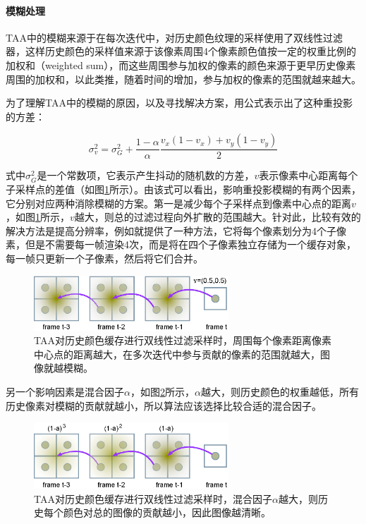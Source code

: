 \paragraph{模糊处理}
TAA中的模糊来源于在每次迭代中，对历史颜色纹理的采样使用了双线性过滤器，这样历史颜色的采样值来源于该像素周围4个像素颜色值按一定的权重比例的加权和（weighted sum），而这些周围参与加权的像素的颜色来源于更早历史像素周围的加权和，以此类推，随着时间的增加，参与加权的像素的范围就越来越大。

为了理解TAA中的模糊的原因，以及寻找解决方案，\cite{a:AmortizedSupersampling}用公式表示出了这种重投影的方差：

\begin{equation}
	\sigma^{2}_v=\sigma^{2}_G+\frac{1-\alpha}{\alpha}\frac{v_x (1-v_x)+v_y(1-v_y)}{2}
\end{equation}

式中$\sigma^{2}_G$是一个常数项，它表示产生抖动的随机数的方差，$v$表示像素中心距离每个子采样点的差值（如图\ref{f:shade-blur-factor-filter}所示）。由该式可以看出，影响重投影模糊的有两个因素，它分别对应两种消除模糊的方案。第一是减少每个子采样点到像素中心点的距离$v$，如图\ref{f:shade-blur-factor-filter}所示，$v$越大，则总的过滤过程向外扩散的范围越大。针对此，比较有效的解决方法是提高分辨率，例如\cite{a:AmortizedSupersampling}就提供了一种方法，它将每个像素划分为4个子像素，但是不需要每一帧渲染4次，而是将在四个子像素独立存储为一个缓存对象，每一帧只更新一个子像素，然后将它们合并。

\begin{figure}
	\sidecaption
	\includegraphics[width=0.65\textwidth]{figures/shade/blur-factor-filter}
	\caption{TAA对历史颜色缓存进行双线性过滤采样时，周围每个像素距离像素中心点的距离越大，在多次迭代中参与贡献的像素的范围就越大，图像就越模糊。}
	\label{f:shade-blur-factor-filter}
\end{figure}

另一个影响因素是混合因子$\alpha$，如图\ref{f:shade-blur-factor-alpha}所示，$\alpha$越大，则历史颜色的权重越低，所有历史像素对模糊的贡献就越小，所以算法应该选择比较合适的混合因子。

\begin{figure}
	\sidecaption
	\includegraphics[width=0.65\textwidth]{figures/shade/blur-factor-alpha}
	\caption{TAA对历史颜色缓存进行双线性过滤采样时，混合因子$\alpha$越大，则历史每个颜色对总的图像的贡献越小，因此图像越清晰。}
	\label{f:shade-blur-factor-alpha}
\end{figure}

